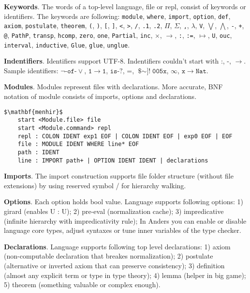 \documentclass{article}
\begin{document}
\textbf{Keywords}. The words of a top-level language, file or repl, consist of keywords or identifiers.
The keywords are following: \texttt{module}, \texttt{where}, \texttt{import}, \texttt{option}, \texttt{def}, \texttt{axiom},
\texttt{postulate}, \texttt{theorem}, \texttt{(}, \texttt{)}, \texttt{[}, \texttt{]}, \texttt{<}, \texttt{>},
\texttt{/}, \texttt{.1}, \texttt{.2}, \texttt{$\Pi$}, \texttt{$\Sigma$}, \texttt{,}, \texttt{$\lambda$},
\texttt{V}, \texttt{$\bigvee$}, \texttt{$\bigwedge$}, \texttt{-}, \texttt{+}, \texttt{@}, \texttt{PathP},
\texttt{transp}, \texttt{hcomp}, \texttt{zero}, \texttt{one}, \texttt{Partial}, \texttt{inc},
\texttt{$\times$}, \texttt{$\rightarrow$}, \texttt{:}, \texttt{:=}, \texttt{$\mapsto$}, \texttt{U},
\texttt{ouc}, \texttt{interval}, \texttt{inductive}, \texttt{Glue}, \texttt{glue}, \texttt{unglue}.

\textbf{Indentifiers}. Identifiers support UTF-8. Indentifiers couldn't
start with $\texttt{:}$, $\texttt{-}$, $\rightarrow$. Sample identifiers:
$\neg\texttt{-of-}\vee$, $\texttt{1}$$\rightarrow$$\texttt{1}$, $\texttt{is-?}$,
$\texttt{=}$, $\texttt{\$$\sim$]!}$$\texttt{005x}$, $\infty$, $\texttt{x}$$\rightarrow$$\texttt{Nat}$.

\textbf{Modules}. Modules represent files with declarations. More accurate, BNF notation of module consists of imports, options and declarations.

\begin{lstlisting}[mathescape=true]
$\mathbf{menhir}$
    start <Module.file> file
    start <Module.command> repl
    repl : COLON IDENT exp1 EOF | COLON IDENT EOF | exp0 EOF | EOF
    file : MODULE IDENT WHERE line* EOF
    path : IDENT
    line : IMPORT path+ | OPTION IDENT IDENT | declarations
\end{lstlisting}

\textbf{Imports}. The import construction supports file folder structure (without file extensions)
by using reserved symbol / for hierarchy walking.

\textbf{Options}. Each option holds bool value. Language supports following options:
1) girard (enables U : U);
2) pre-eval (normalization cache);
3) impredicative (infinite hierarchy with impredicativity rule);
In Anders you can enable or disable language core types, adjust syntaxes or
tune inner variables of the type checker.

\textbf{Declarations}. Language supports following top level declarations:
1) axiom (non-computable declaration that breakes normalization);
2) postulate (alternative or inverted axiom that can preserve consistency);
3) definition (almost any explicit term or type in type theory);
4) lemma (helper in big game);
5) theorem (something valuable or complex enough).
\end{document}

